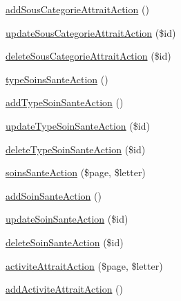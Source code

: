 \begin{DoxyCompactItemize}
\hyperlink{class_my_app_1_1_admin_bundle_1_1_controller_1_1_attrait_controller_a054ce266cf19f9adbda0c3957c6d7167}{add\-Sous\-Categorie\-Attrait\-Action} ()
\item 
\hyperlink{class_my_app_1_1_admin_bundle_1_1_controller_1_1_attrait_controller_ae5c5b5f5ff04471e8fdd4f800ee791b5}{update\-Sous\-Categorie\-Attrait\-Action} (\$id)
\item 
\hyperlink{class_my_app_1_1_admin_bundle_1_1_controller_1_1_attrait_controller_a0dbd1e86513774b902a29aa2f316b126}{delete\-Sous\-Categorie\-Attrait\-Action} (\$id)
\item 
\hyperlink{class_my_app_1_1_admin_bundle_1_1_controller_1_1_attrait_controller_a333ad2bfcb8a32a51997f1c93decd481}{type\-Soins\-Sante\-Action} ()
\item 
\hyperlink{class_my_app_1_1_admin_bundle_1_1_controller_1_1_attrait_controller_a18ffec3f1c1c836bcd41f7c7f21fc595}{add\-Type\-Soin\-Sante\-Action} ()
\item 
\hyperlink{class_my_app_1_1_admin_bundle_1_1_controller_1_1_attrait_controller_a97a8555f31458be46da0305b37b1f9dc}{update\-Type\-Soin\-Sante\-Action} (\$id)
\item 
\hyperlink{class_my_app_1_1_admin_bundle_1_1_controller_1_1_attrait_controller_a58828821a2c8d907d7a88252846d2f25}{delete\-Type\-Soin\-Sante\-Action} (\$id)
\item 
\hyperlink{class_my_app_1_1_admin_bundle_1_1_controller_1_1_attrait_controller_afb169edb50466921d9ab5d7949a40a1e}{soins\-Sante\-Action} (\$page, \$letter)
\item 
\hyperlink{class_my_app_1_1_admin_bundle_1_1_controller_1_1_attrait_controller_a8382126069063ef20e1bcef27ae9ac05}{add\-Soin\-Sante\-Action} ()
\item 
\hyperlink{class_my_app_1_1_admin_bundle_1_1_controller_1_1_attrait_controller_a745d2c8be94b341168da68bc49674c46}{update\-Soin\-Sante\-Action} (\$id)
\item 
\hyperlink{class_my_app_1_1_admin_bundle_1_1_controller_1_1_attrait_controller_a9740d0fd552d631ef02391b69c69b952}{delete\-Soin\-Sante\-Action} (\$id)
\item 
\hyperlink{class_my_app_1_1_admin_bundle_1_1_controller_1_1_attrait_controller_a79771274507157ef7492cda96c82477a}{activite\-Attrait\-Action} (\$page, \$letter)
\item 
\hyperlink{class_my_app_1_1_admin_bundle_1_1_controller_1_1_attrait_controller_a6f8a8f96b7c4ae89564a26cfeda41867}{add\-Activite\-Attrait\-Action} ()
\item 

\end{DoxyCompactItemize}
